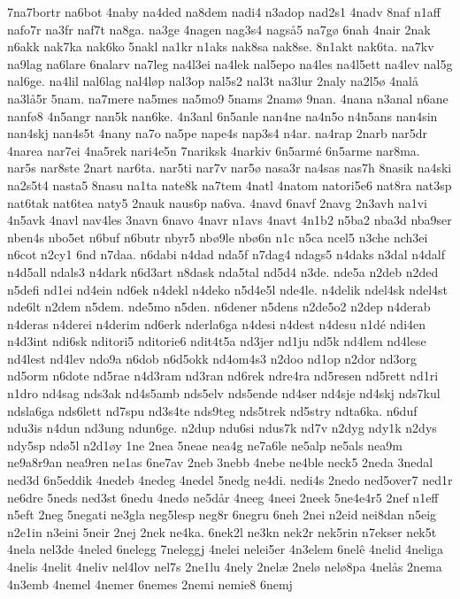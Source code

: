 7na7bortr
na6bot
4naby
na4ded
na8dem
nadi4
n3adop
nad2s1
4nadv
8naf
n1aff
nafo7r
na3fr
naf7t
na8ga.
na3ge
4nagen
nag3s4
nags^^e55
na7g^^f8
6nah
4nair
2nak
n6akk
nak7ka
nak6ko
5nakl
na1kr
n1aks
nak8sa
nak8se.
8n1akt
nak6ta.
na7kv
na9lag
na6lare
6nalarv
na7leg
na4l3ei
na4lek
nal5epo
na4les
na4l5ett
na4lev
nal5g
nal6ge.
na4lil
nal6lag
nal4l^^f8p
nal3op
nal5s2
nal3t
na3lur
2naly
na2l5^^f8
4nal^^e5
na3l^^e55r
5nam.
na7mere
na5mes
na5mo9
5nams
2nam^^f8
9nan.
4nana
n3anal
n6ane
nanf^^f88
4n5angr
nan5k
nan6ke.
4n3anl
6n5anle
nan4ne
na4n5o
n4n5ans
nan4sin
nan4skj
nan4s5t
4nany
na7o
na5pe
nape4s
nap3s4
n4ar.
na4rap
2narb
nar5dr
4narea
nar7ei
4na5rek
nari4e5n
7nariksk
4narkiv
6n5arm^^e9
6n5arme
nar8ma.
nar5s
nar8ste
2nart
nar6ta.
nar5ti
nar7v
nar5^^f8
nasa3r
na4sas
nas7h
8nasik
na4ski
na2s5t4
nasta5
8nasu
na1ta
nate8k
na7tem
4natl
4natom
natori5e6
nat8ra
nat3sp
nat6tak
nat6tea
naty5
2nauk
naus6p
na6va.
4navd
6navf
2navg
2n3avh
na1vi
4n5avk
4navl
nav4les
3navn
6navo
4navr
n1avs
4navt
4n1b2
n5ba2
nba3d
nba9ser
nben4s
nbo5et
n6buf
n6butr
nbyr5
nb^^f89le
nb^^f86n
n1c
n5ca
ncel5
n3che
nch3ei
n6cot
n2cy1
6nd
n7daa.
n6dabi
n4dad
nda5f
n7dag4
ndags5
n4daks
n3dal
n4dalf
n4d5all
ndals3
n4dark
n6d3art
n8dask
nda5tal
nd5d4
n3de.
nde5a
n2deb
n2ded
n5defi
nd1ei
nd4ein
nd6ek
n4dekl
n4deko
n5d4e5l
nde4le.
n4delik
ndel4sk
ndel4st
nde6lt
n2dem
n5dem.
nde5mo
n5den.
n6dener
n5dens
n2de5o2
n2dep
n4derab
n4deras
n4derei
n4derim
nd6erk
nderla6ga
n4desi
n4dest
n4desu
n1d^^e9
ndi4en
n4d3int
ndi6sk
nditori5
nditorie6
ndit4t5a
nd3jer
nd1ju
nd5k
nd4lem
nd4lese
nd4lest
nd4lev
ndo9a
n6dob
n6d5okk
nd4om4s3
n2doo
nd1op
n2dor
nd3org
nd5orm
n6dote
nd5rae
n4d3ram
nd3ran
nd6rek
ndre4ra
nd5resen
nd5rett
nd1ri
n1dro
nd4sag
nds3ak
nd4s5amb
nds5elv
nds5ende
nd4ser
nd4sje
nd4skj
nds7kul
ndsla6ga
nds6lett
nd7spu
nd3s4te
nds9teg
nds5trek
nd5stry
ndta6ka.
n6duf
ndu3is
n4dun
nd3ung
ndun6ge.
n2dup
ndu6si
ndus7k
nd7v
n2dyg
ndy1k
n2dys
ndy5sp
nd^^f85l
n2d1^^f8y
1ne
2nea
5neae
nea4g
ne7a6le
ne5alp
ne5als
nea9m
ne9a8r9an
nea9ren
ne1as
6ne7av
2neb
3nebb
4nebe
ne4ble
neck5
2neda
3nedal
ned3d
6n5eddik
4nedeb
4nedeg
4nedel
5nedg
ne4di.
nedi4s
2nedo
ned5over7
ned1r
ne6dre
5neds
ned3st
6nedu
4ned^^f8
ne5d^^e5r
4neeg
4neei
2neek
5ne4e4r5
2nef
n1eff
n5eft
2neg
5negati
ne3gla
neg5lesp
neg8r
6negru
6neh
2nei
n2eid
nei8dan
n5eig
n2e1in
n3eini
5neir
2nej
2nek
ne4ka.
6nek2l
ne3kn
nek2r
nek5rin
n7ekser
nek5t
4nela
nel3de
4neled
6nelegg
7neleggj
4nelei
nelei5er
4n3elem
6nel^^ea
4nelid
4neliga
4nelis
4nelit
4neliv
nel4lov
nel7s
2ne1lu
4nely
2nel^^e6
2nel^^f8
nel^^f88pa
4nel^^e5s
2nema
4n3emb
4nemel
4nemer
6nemes
2nemi
nemie8
6nemj
